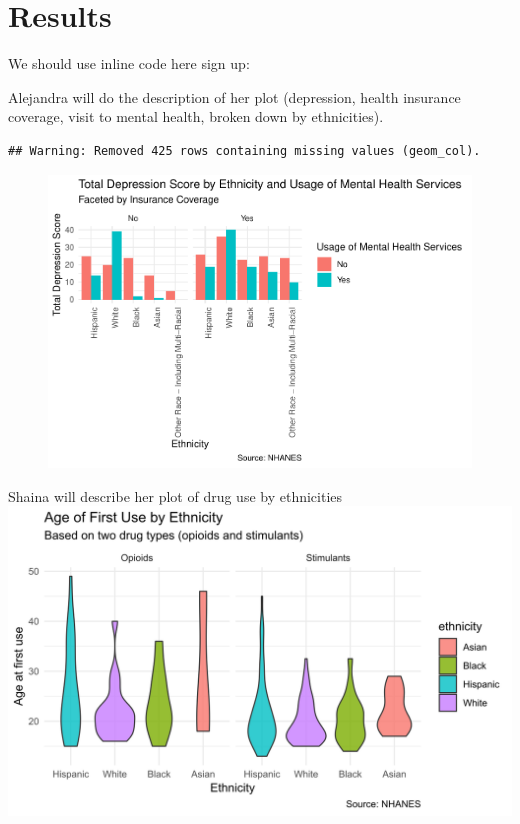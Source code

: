 \documentclass[man]{apa6}
\begin{document}
\section{Results}\label{results}

We should use inline code here sign up:

Alejandra will do the description of her plot (depression, health
insurance coverage, visit to mental health, broken down by ethnicities).

\begin{verbatim}
## Warning: Removed 425 rows containing missing values (geom_col).
\end{verbatim}

\begin{figure}
\centering
\includegraphics{Final_Paper_Group_3_files/figure-latex/plot1-1.pdf}
\caption{}
\end{figure}

Shaina will describe her plot of drug use by ethnicities
\includegraphics{Final_Paper_Group_3_files/figure-latex/ST_plot-1.svg}
\end{document}
